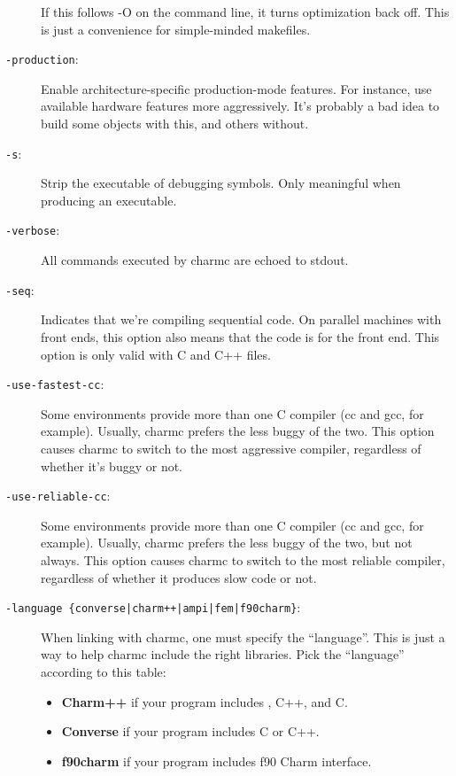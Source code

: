 \begin{description}
If this follows -O on the command line, it turns optimization back off.
This is just a convenience for simple-minded makefiles.

\item[{\tt -production}:]

Enable architecture-specific production-mode features. For instance,
use available hardware features more aggressively. It's probably a bad
idea to build some objects with this, and others without.

\item[{\tt -s}:]

Strip the executable of debugging symbols.  Only meaningful when
producing an executable.

\item[{\tt -verbose}:]

All commands executed by charmc are echoed to stdout.

\item[{\tt -seq}:]

Indicates that we're compiling sequential code.  On parallel machines
with front ends, this option also means that the code is for the front
end.  This option is only valid with C and C++ files.

\item[{\tt -use-fastest-cc}:]

Some environments provide more than one C compiler (cc and gcc, for
example).  Usually, charmc prefers the less buggy of the two.  This
option causes charmc to switch to the most aggressive compiler,
regardless of whether it's buggy or not.

\item[{\tt -use-reliable-cc}:]

Some environments provide more than one C compiler (cc and gcc, for
example).  Usually, charmc prefers the less buggy of the two, but
not always.  This option causes charmc to switch to the most reliable
compiler, regardless of whether it produces slow code or not.

\item[{\tt -language \{converse|charm++|ampi|fem|f90charm\}}:]

When linking with charmc, one must specify the ``language''.  This
is just a way to help charmc include the right libraries.  Pick the
``language'' according to this table:

\begin{itemize}
\item{{\bf Charm++} if your program includes \charmpp{}, C++, and C.}
\item{{\bf Converse} if your program includes C or C++.}
\item{{\bf f90charm} if your program includes f90 Charm interface.}
\end{itemize}


\end{description}
